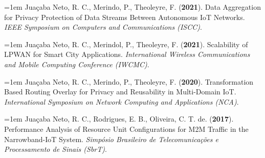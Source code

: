 
{\small

\hangindent=1em
Juaçaba Neto, R. C., Merindo, P., Theoleyre, F. (\textbf{2021}). Data Aggregation for Privacy Protection of Data Streams Between Autonomous IoT Networks. \textit{IEEE Symposium on Computers and Communications (ISCC)}.
\enskip

\hangindent=1em
Juaçaba Neto, R. C., Merindol, P., Theoleyre, F. (\textbf{2021}). Scalability of LPWAN for Smart City Applications. \textit{International Wireless Communications and Mobile Computing Conference (IWCMC)}.
\enskip

\hangindent=1em
Juaçaba Neto, R. C., Merindo, P., Theoleyre, F. (\textbf{2020}). Transformation Based Routing Overlay for Privacy and Reusability in Multi-Domain IoT. \textit{International Symposium on Network Computing and Applications (NCA)}.
\enskip

\hangindent=1em
Juaçaba Neto, R. C., Rodrigues, E. B., Oliveira, C. T. de. (\textbf{2017}). Performance Analysis of Resource Unit Configurations for M2M Traffic in the Narrowband-IoT System. \textit{Simpósio Brasileiro de Telecomunicações e Processamento de Sinais (SbrT)}.

}
